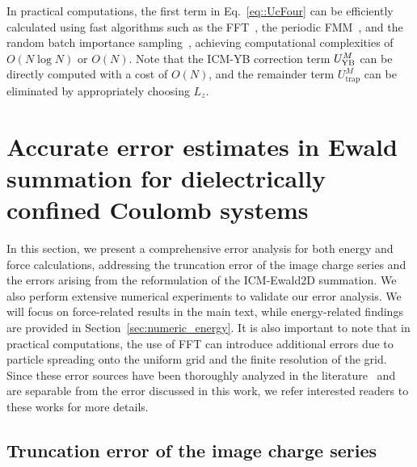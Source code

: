 In practical computations, the first term in Eq.~\eqref{eq::UcFour} can be efficiently calculated using fast algorithms such as the FFT~\cite{yuan2021particle}, the periodic FMM~\cite{pei2023fast}, and the random batch importance sampling~\cite{liang2022improved}, achieving computational complexities of $O(N\log N)$ or $O(N)$. 
Note that the ICM-YB correction term $U_{\text{YB}}^{M}$ can be directly computed with a cost of $O(N)$, and the remainder term $U_{\text{trap}}^M$ can be eliminated by appropriately choosing $L_z$.

\section{Accurate error estimates in Ewald summation for dielectrically confined Coulomb systems}

In this section, we present a comprehensive error analysis for both energy and force calculations, addressing the truncation error of the image charge series and the errors arising from the reformulation of the ICM-Ewald2D summation. 
We also perform extensive numerical experiments to validate our error analysis.
We will focus on force-related results in the main text, while energy-related findings are provided in Section~\ref{sec:numeric_energy}.
It is also important to note that in practical computations, the use of FFT can introduce additional errors due to particle spreading onto the uniform grid and the finite resolution of the grid. 
Since these error sources have been thoroughly analyzed in the literature~\cite{deserno1998mesh,wang2012numerical,liang2023error,wang2016multiple,barnett2019parallel,barnett2021aliasing} and are separable from the error discussed in this work, we refer interested readers to these works for more details.

\subsection{Truncation error of the image charge series}\label{sec:error_image}


